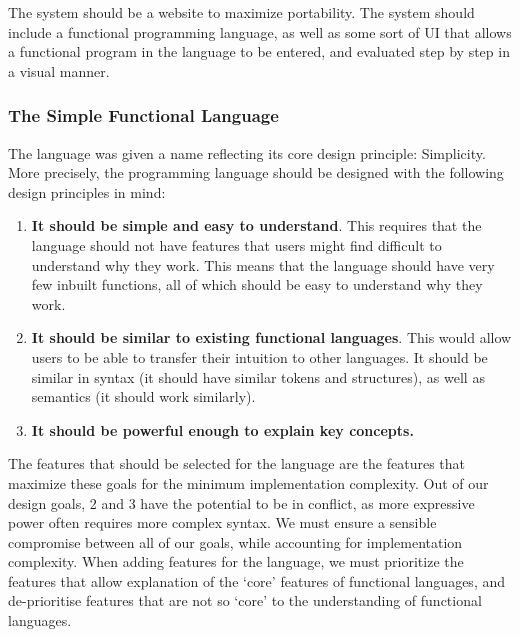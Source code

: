 The system should be a website to maximize portability. The system should include a functional programming language, as well as some sort of UI that allows a functional program in the language to be entered, and evaluated step by step in a visual manner. 


\subsubsection{The Simple Functional Language}
\label{design:goals}
The language was given a name reflecting its core design principle: Simplicity. More precisely, the programming language should be designed with the following design principles in mind:
\begin{enumerate}
    \item \textbf{It should be simple and easy to understand}. This requires that the language should not have features that users might find difficult to understand why they work. This means that the language should have very few inbuilt functions, all of which should be easy to understand why they work. 
    \item \textbf{It should be similar to existing functional languages}. This would allow users to be able to transfer their intuition to other languages. It should be similar in syntax (it should have similar tokens and structures), as well as semantics (it should work similarly). 
    \item \textbf{It should be powerful enough to explain key concepts.}
\end{enumerate}
The features that should be selected for the language are the features that maximize these goals for the minimum implementation complexity. Out of our design goals, 2 and 3 have the potential to be in conflict, as more expressive power often requires more complex syntax. We must ensure a sensible compromise between all of our goals, while accounting for implementation complexity. When adding features for the language, we must prioritize the features that allow explanation of the `core' features of functional languages, and de-prioritise features that are not so `core' to the understanding of functional languages. 

